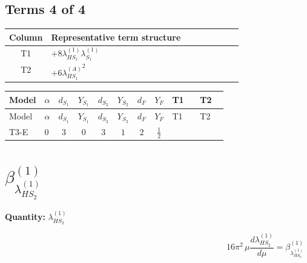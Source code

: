\documentclass[8pt]{article}
\begin{document}
\begin{landscape}
\subsection*{Terms 4 of 4}
\begin{center}
\begin{tabular}{@{}c >{\raggedright\arraybackslash}p{0.82\linewidth}@{}}
\toprule
Column & Representative term structure \\
\midrule
T1 & \(\displaystyle +8 {\lambda_{HS_1}^{(1)}} {\lambda_{S_1}^{(1)}}\) \\
\midrule
T2 & \(\displaystyle +6 {\lambda_{HS_1}^{(A)}}^2\) \\
\midrule
\bottomrule
\end{tabular}
\end{center}
\smallskip
\tiny
\begin{longtable}{@{}llcccccc >{\raggedright\arraybackslash}p{0.21\linewidth} >{\raggedright\arraybackslash}p{0.21\linewidth}@{}}
\toprule
Model & $\alpha$ & $d_{S_1}$ & $Y_{S_1}$ & $d_{S_2}$ & $Y_{S_2}$ & $d_F$ & $Y_F$ & T1 & T2 \\
\midrule
\endfirsthead
\toprule
Model & $\alpha$ & $d_{S_1}$ & $Y_{S_1}$ & $d_{S_2}$ & $Y_{S_2}$ & $d_F$ & $Y_F$ & T1 & T2 \\
\midrule
\endhead
T3-E & $0$ & $3$ & $0$ & $3$ & $1$ & $2$ & $\frac{1}{2}$ & \scriptsize\adjustbox{max width=\linewidth}{$\begin{gathered} +8 {\lambda_{HS_1}^{(1)}} {\lambda_{S_1}^{(1)}}\end{gathered}$} & \scriptsize\adjustbox{max width=\linewidth}{$\begin{gathered} +6 {\lambda_{HS_1}^{(A)}}^2\end{gathered}$} \\
\midrule
\bottomrule
\end{longtable}
\clearpage
\section*{$\beta_{\lambda_{HS_2}^{(1)}}^{(1)}$}
\noindent\textbf{Quantity: }$\lambda_{HS_2}^{(1)}$\par\smallskip
\[16\pi^2\,\mu\frac{d \lambda_{HS_2}^{(1)}}{d\mu}=\beta_{\lambda_{HS_2}^{(1)}}^{(1)}\]

\end{landscape}
\end{document}
